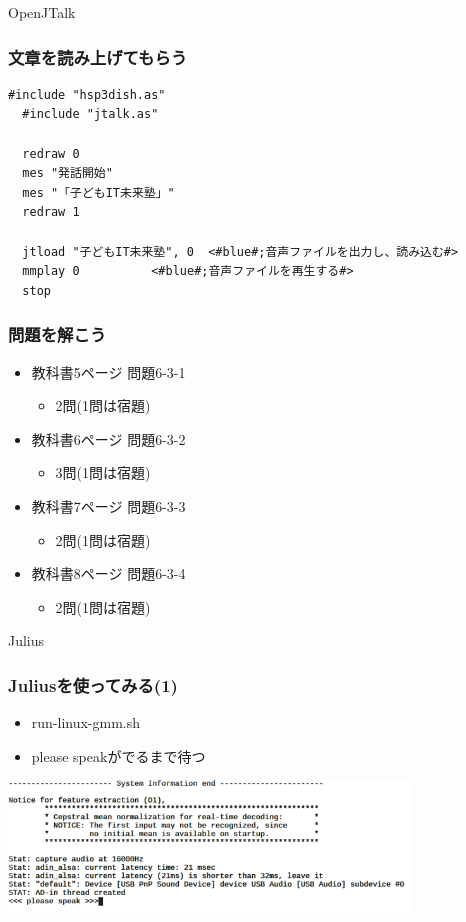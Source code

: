 \documentclass[14pt]{beamer}
\begin{document}
\begin{frame}
  \centering
  OpenJTalk
\end{frame}

\begin{frame}[fragile]
  \frametitle{文章を読み上げてもらう}
  
  \begin{lstlisting}[caption=openjtalk.hsp,label=openjtalk.hsp]
  #include "hsp3dish.as"
  #include "jtalk.as"

  redraw 0
  mes "発話開始"
  mes "「子どもIT未来塾」"
  redraw 1

  jtload "子どもIT未来塾", 0	<#blue#;音声ファイルを出力し、読み込む#>
  mmplay 0			<#blue#;音声ファイルを再生する#>
  stop
  \end{lstlisting}
\end{frame}

\begin{frame}
  \frametitle{問題を解こう}
  \begin{itemize}
    \item 教科書5ページ 問題6-3-1
    \begin{itemize}
      \item 2問(1問は宿題)
    \end{itemize}
    \item 教科書6ページ 問題6-3-2
    \begin{itemize}
      \item 3問(1問は宿題)
    \end{itemize}
    \item 教科書7ページ 問題6-3-3
    \begin{itemize}
      \item 2問(1問は宿題)
    \end{itemize}
    \item 教科書8ページ 問題6-3-4
    \begin{itemize}
      \item 2問(1問は宿題)
    \end{itemize}
  \end{itemize}
  
\end{frame}

\begin{frame}
  \centering
  Julius
\end{frame}

\begin{frame}
  \frametitle{Juliusを使ってみる(1)}
  \begin{itemize}
    \item run-linux-gmm.sh
    \item \<\<please speak\>\>がでるまで待つ
  \end{itemize}
  \centering
  \includegraphics[width=0.8\textwidth]{chap06/text06-img009.png}
\end{frame}
\end{document}
